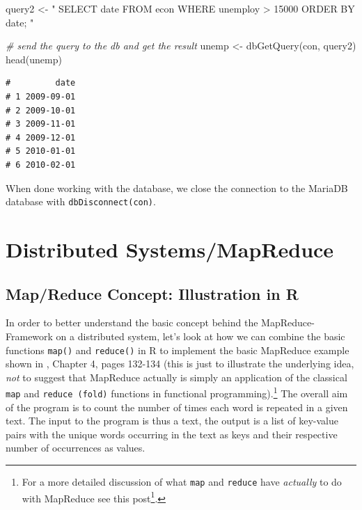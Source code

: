\documentclass[
  12pt,
]{style/krantz}
\newenvironment{Shaded}{\begin{snugshade}}{\end{snugshade}}
\newcommand{\CommentTok}[1]{\textcolor[rgb]{0.56,0.35,0.01}{\textit{#1}}}
\newcommand{\FunctionTok}[1]{\textcolor[rgb]{0.00,0.00,0.00}{#1}}
\newcommand{\NormalTok}[1]{#1}
\newcommand{\OtherTok}[1]{\textcolor[rgb]{0.56,0.35,0.01}{#1}}
\newcommand{\StringTok}[1]{\textcolor[rgb]{0.31,0.60,0.02}{#1}}
\renewcommand{\href}[2]{#2\footnote{\url{#1}}}
\begin{document}
\begin{Shaded}
\begin{Highlighting}[]
\NormalTok{query2 }\OtherTok{\textless{}{-}}
\StringTok{"}
\StringTok{SELECT date FROM econ }
\StringTok{WHERE unemploy \textgreater{} 15000}
\StringTok{ORDER BY date;}
\StringTok{"}

\CommentTok{\# send the query to the db and get the result}
\NormalTok{unemp }\OtherTok{\textless{}{-}} \FunctionTok{dbGetQuery}\NormalTok{(con, query2)}
\FunctionTok{head}\NormalTok{(unemp)}
\end{Highlighting}
\end{Shaded}

\begin{verbatim}
#         date
# 1 2009-09-01
# 2 2009-10-01
# 3 2009-11-01
# 4 2009-12-01
# 5 2010-01-01
# 6 2010-02-01
\end{verbatim}

When done working with the database, we close the connection to the MariaDB database with \texttt{dbDisconnect(con)}.

\hypertarget{distributed-systemsmapreduce}{%
\section{Distributed Systems/MapReduce}\label{distributed-systemsmapreduce}}

\hypertarget{mapreduce-concept-illustration-in-r}{%
\subsection{Map/Reduce Concept: Illustration in R}\label{mapreduce-concept-illustration-in-r}}

In order to better understand the basic concept behind the MapReduce-Framework on a distributed system, let's look at how we can combine the basic functions \texttt{map()} and \texttt{reduce()} in R to implement the basic MapReduce example shown in \citet{walkowiak_2016}, Chapter 4, pages 132-134 (this is just to illustrate the underlying idea, \emph{not} to suggest that MapReduce actually is simply an application of the classical \texttt{map} and \texttt{reduce\ (fold)} functions in functional programming).\footnote{For a more detailed discussion of what \texttt{map} and \texttt{reduce} have \emph{actually} to do with MapReduce see \href{https://medium.com/@jkff/mapreduce-is-not-functional-programming-39109a4ba7b2}{this post}.} The overall aim of the program is to count the number of times each word is repeated in a given text. The input to the program is thus a text, the output is a list of key-value pairs with the unique words occurring in the text as keys and their respective number of occurrences as values.
\end{document}
